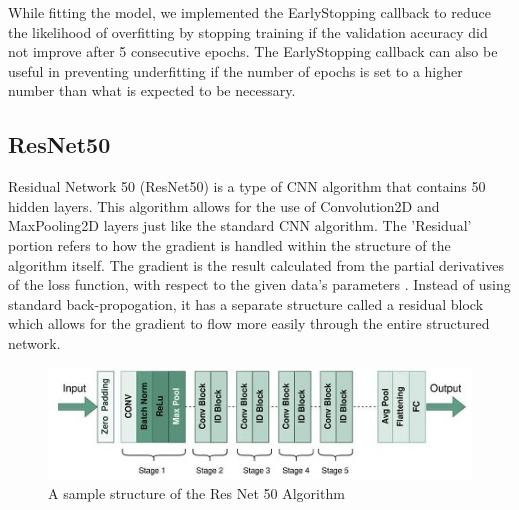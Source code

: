 While fitting the model, we implemented the EarlyStopping callback to reduce the likelihood of overfitting by stopping training if the validation accuracy did not improve after 5 consecutive epochs. The EarlyStopping callback can also be useful in preventing underfitting if the number of epochs is set to a higher number than what is expected to be necessary. 

\subsection{ResNet50}

Residual Network 50 (ResNet50) is a type of CNN algorithm that contains 50 hidden layers. 
This algorithm allows for the use of Convolution2D and MaxPooling2D layers just like the standard CNN algorithm.
The 'Residual' portion refers to how the gradient is handled within the structure of the algorithm itself.
The gradient is the result calculated from the partial derivatives of the loss function, with respect to the given data's parameters \cite{Gradient}.
Instead of using standard back-propogation, it has a separate structure called a residual block which allows for the gradient to flow more easily through the entire structured network\cite{RN50}.

\begin{figure}[h]
	\centering
	\includegraphics[scale=0.5]{ResNet_structure.jpg}
	\caption{A sample structure of the Res Net 50 Algorithm}
	\label{fig:figure5}
\end{figure}

